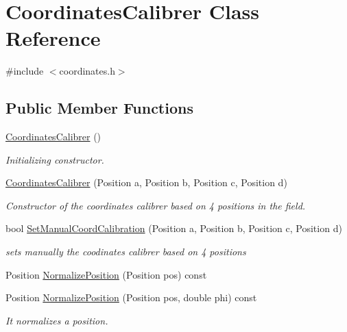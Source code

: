 \hypertarget{classCoordinatesCalibrer}{
\section{CoordinatesCalibrer Class Reference}
\label{classCoordinatesCalibrer}
}


{\ttfamily \#include $<$coordinates.h$>$}

\subsection*{Public Member Functions}
\begin{DoxyCompactItemize}
\item 
\hyperlink{classCoordinatesCalibrer_ac9a522299ada8f2e58ed8f0c91f4f396}{CoordinatesCalibrer} ()
\begin{DoxyCompactList}\small\item\em Initializing constructor. \item\end{DoxyCompactList}\item 
\hyperlink{classCoordinatesCalibrer_a3b6304945fa64ac97a1b0bbc78753155}{CoordinatesCalibrer} (Position a, Position b, Position c, Position d)
\begin{DoxyCompactList}\small\item\em Constructor of the coordinates calibrer based on 4 positions in the field. \item\end{DoxyCompactList}\item 
bool \hyperlink{classCoordinatesCalibrer_a006c18905b14e4780b9fc74fe26649fc}{SetManualCoordCalibration} (Position a, Position b, Position c, Position d)
\begin{DoxyCompactList}\small\item\em sets manually the coodinates calibrer based on 4 positions \item\end{DoxyCompactList}\item 
Position \hyperlink{classCoordinatesCalibrer_ad6519b69842756c256922d14d1e248ce}{NormalizePosition} (Position pos) const 
\item 
Position \hyperlink{classCoordinatesCalibrer_a034180f011c23565b9b5907ce0219fbf}{NormalizePosition} (Position pos, double phi) const 
\begin{DoxyCompactList}\small\item\em It normalizes a position. \item\end{DoxyCompactList}\item 

\end{DoxyCompactItemize}
